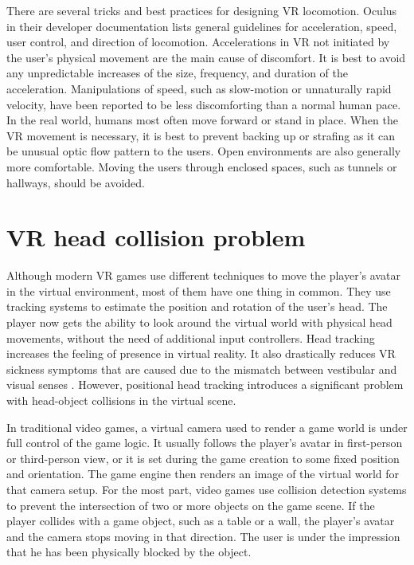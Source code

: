 There are several tricks and best practices for designing VR locomotion. Oculus in their developer documentation \cite{OCULUSDOC} lists general guidelines for acceleration, speed, user control, and direction of locomotion. Accelerations in VR not initiated by the user's physical movement are the main cause of discomfort. It is best to avoid any unpredictable increases of the size, frequency, and duration of the acceleration. Manipulations of speed, such as slow-motion or unnaturally rapid velocity, have been reported to be less discomforting than a normal human pace. In the real world, humans most often move forward or stand in place. When the VR movement is necessary, it is best to prevent backing up or strafing as it can be unusual optic flow pattern to the users. Open environments are also generally more comfortable. Moving the users through enclosed spaces, such as tunnels or hallways, should be avoided.

\section{VR head collision problem}

Although modern VR games use different techniques to move the player's avatar in the virtual environment, most of them have one thing in common. They use tracking systems to estimate the position and rotation of the user's head. The player now gets the ability to look around the virtual world with physical head movements, without the need of additional input controllers. Head tracking increases the feeling of presence in virtual reality. It also drastically reduces VR sickness symptoms that are caused due to the mismatch between vestibular and visual senses \cite{HEADTRACKINGSYMPTOMS}. However, positional head tracking introduces a significant problem with head-object collisions in the virtual scene.

In traditional video games, a virtual camera used to render a game world is under full control of the game logic. It usually follows the player's avatar in first-person or third-person view, or it is set during the game creation to some fixed position and orientation. The game engine then renders an image of the virtual world for that camera setup. For the most part, video games use collision detection systems to prevent the intersection of two or more objects on the game scene. If the player collides with a game object, such as a table or a wall, the player's avatar and the camera stops moving in that direction. The user is under the impression that he has been physically blocked by the object. 

